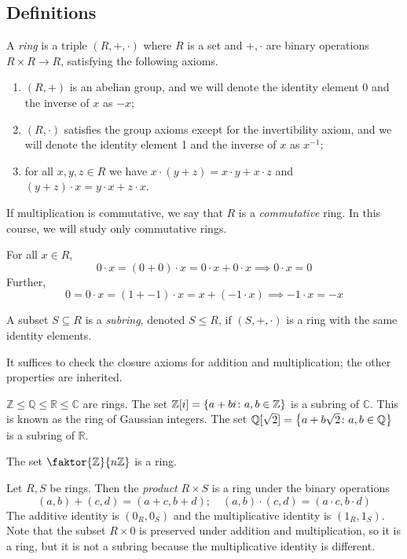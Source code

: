 \subsection{Definitions}
\begin{definition}
	A \textit{ring} is a triple \( (R, +, \cdot) \) where \( R \) is a set and \( +, \cdot \) are binary operations \( R \times R \to R \), satisfying the following axioms.
	\begin{enumerate}
		\item \( (R, +) \) is an abelian group, and we will denote the identity element 0 and the inverse of \( x \) as \( -x \);
		\item \( (R, \cdot) \) satisfies the group axioms except for the invertibility axiom, and we will denote the identity element 1 and the inverse of \( x \) as \( x^{-1} \);
		\item for all \( x, y, z \in R \) we have \( x \cdot (y+z) = x\cdot y + x\cdot z \) and \( (y+z)\cdot x = y \cdot x + z \cdot x \).
	\end{enumerate}
	If multiplication is commutative, we say that \( R \) is a \textit{commutative} ring.
	In this course, we will study only commutative rings.
\end{definition}
\begin{remark}
	For all \( x \in R \),
	\[ 0 \cdot x = (0+0) \cdot x = 0 \cdot x + 0 \cdot x \implies 0 \cdot x = 0 \]
	Further,
	\[ 0 = 0 \cdot x = (1 + -1) \cdot x = x + (-1 \cdot x) \implies -1 \cdot x = -x \]
\end{remark}
\begin{definition}
	A subset \( S \subseteq R \) is a \textit{subring}, denoted \( S \leq R \), if \( (S, +, \cdot) \) is a ring with the same identity elements.
\end{definition}
\begin{remark}
	It suffices to check the closure axioms for addition and multiplication; the other properties are inherited.
\end{remark}
\begin{example}
	\( \mathbb Z \leq \mathbb Q \leq \mathbb R \leq \mathbb C \) are rings.
	The set \( \mathbb Z[i] = \qty{a+bi \colon a,b\in\mathbb Z} \) is a subring of \( \mathbb C \).
	This is known as the ring of Gaussian integers.
	The set \( \mathbb Q[\sqrt{2}] = \qty{a+b\sqrt{2} \colon a,b \in\mathbb Q} \) is a subring of \( \mathbb R \).
\end{example}
\begin{example}
	The set \( \faktor{\mathbb Z}{n\mathbb Z} \) is a ring.
\end{example}
\begin{example}
	Let \( R, S \) be rings.
	Then the \textit{product} \( R \times S \) is a ring under the binary operations
	\[ (a,b) + (c,d) = (a+c,b+d);\quad (a,b) \cdot (c,d) = (a\cdot c,b\cdot d) \]
	The additive identity is \( (0_R, 0_S) \) and the multiplicative identity is \( (1_R, 1_S) \).
	Note that the subset \( R \times \qty{0} \) is preserved under addition and multiplication, so it is a ring, but it is not a subring because the multiplicative identity is different.
\end{example}

